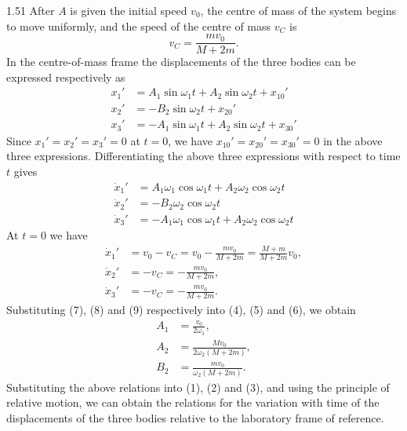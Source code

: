 \begin{solution}{1.51}
After $A$ is given the initial speed $v_0$, the centre of mass of the system begins to move uniformly, and the speed of the centre of mass $v_C$ is
\[
v_C=\frac{mv_0}{M+2m}.
\]
In the centre-of-mass frame the displacements of the three bodies can be expressed respectively as
\begin{align}
x_1'&=A_1\sin\omega_1t+A_2\sin\omega_2t+x_{10}' \tag{1}\\
x_2'&=-B_2\sin\omega_2t+x_{20}' \tag{2}\\
x_3'&=-A_1\sin\omega_1t+A_2\sin\omega_2t+x_{30}' \tag{3}
\end{align}
Since $x_1'=x_2'=x_3'=0$ at $t=0$, we have $x_{10}'=x_{20}'=x_{30}'=0$ in the above three expressions. Differentiating the above three expressions with respect to time $t$ gives
\begin{align}
\dot{x}_1'&=A_1\omega_1\cos\omega_1t+A_2\omega_2\cos\omega_2t \tag{4}\\
\dot{x}_2'&=-B_2\omega_2\cos\omega_2t \tag{5}\\
\dot{x}_3'&=-A_1\omega_1\cos\omega_1t+A_2\omega_2\cos\omega_2t \tag{6}
\end{align}
At $t=0$ we have
\begin{align}
\dot{x}_1'&=v_0-v_C=v_0-\frac{mv_0}{M+2m}=\frac{M+m}{M+2m}v_0, \tag{7}\\
\dot{x}_2'&=-v_C=-\frac{mv_0}{M+2m}, \tag{8}\\
\dot{x}_3'&=-v_C=-\frac{mv_0}{M+2m}. \tag{9}
\end{align}
Substituting (7), (8) and (9) respectively into (4), (5) and (6), we obtain
\[
\begin{aligned}
A_1&=\frac{v_0}{2\omega_1},\\
A_2&=\frac{Mv_0}{2\omega_2(M+2m)},\\
B_2&=\frac{mv_0}{\omega_2(M+2m)}.
\end{aligned}
\]
Substituting the above relations into (1), (2) and (3), and using the principle of relative motion, we can obtain the relations for the variation with time of the displacements of the three bodies relative to the laboratory frame of reference.
\end{solution}

